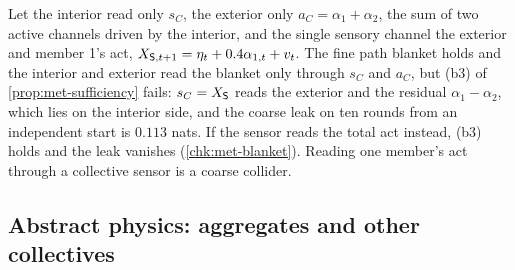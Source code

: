 \begin{example}\label{ex:met-reafference}
Let the interior read only $s_C$, the exterior only $a_C=\alpha_1+\alpha_2$, the sum of two active channels driven by the interior, and the single sensory channel the exterior and member 1's act, $X_{\mathsf{S},t+1}=\eta_t+0.4\alpha_{1,t}+v_t$. The fine path blanket holds and the interior and exterior read the blanket only through $s_C$ and $a_C$, but (b3) of \cref{prop:met-sufficiency} fails: $s_C=X_{\mathsf{S}}$ reads the exterior and the residual $\alpha_1-\alpha_2$, which lies on the interior side, and the coarse leak on ten rounds from an independent start is $0.113$ nats. If the sensor reads the total act instead, (b3) holds and the leak vanishes (\cref{chk:met-blanket}). Reading one member's act through a collective sensor is a coarse collider.
\end{example}

\subsection{Abstract physics: aggregates and other collectives}\label{sup:met-abstract-physics-aggregates-and-other-co}

